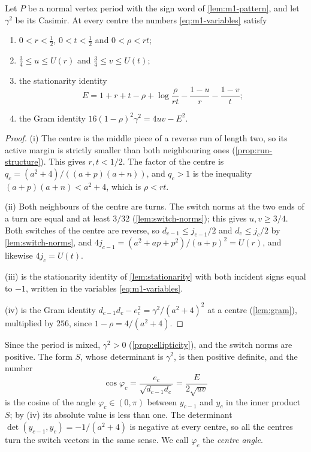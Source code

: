 \begin{lemma}\label{lem:m1-centre-data}
  Let $P$ be a normal vertex period with the sign word of \cref{lem:m1-pattern}, and let $\gamma^2$
  be its Casimir. At every centre the numbers \eqref{eq:m1-variables} satisfy
  \begin{enumerate}[label=\textup{(\roman*)}]
    \item $0<r<\tfrac12$, $0<t<\tfrac12$ and $0<\rho<rt$;
    \item $\tfrac34\le u\le U(r)$ and $\tfrac34\le v\le U(t)$;
    \item the stationarity identity
    \begin{equation}\label{eq:m1-stat}
      E=1+r+t-\rho+\log\frac{\rho}{rt}-\frac{1-u}r-\frac{1-v}t;
    \end{equation}
    \item the Gram identity $16(1-\rho)^2\gamma^2=4uv-E^2$.
  \end{enumerate}
\end{lemma}

\begin{proof}
  (i) The centre is the middle piece of a reverse run of length two, so its active margin is
  strictly smaller than both neighbouring ones (\cref{prop:run-structure}). This gives
  $r,t<1/2$. The factor of the centre is $q_c=(a^2+4)/((a+p)(a+n))$, and $q_c>1$ is the
  inequality $(a+p)(a+n)<a^2+4$, which is $\rho<rt$.

  (ii) Both neighbours of the centre are turns. The switch norms at the two ends of a turn are
  equal and at least $3/32$ (\cref{lem:switch-norms}); this gives $u,v\ge 3/4$. Both switches of
  the centre are reverse, so $d_{c-1}\le j_{c-1}/2$ and $d_c\le j_c/2$ by \cref{lem:switch-norms},
  and $4j_{c-1}=(a^2+ap+p^2)/(a+p)^2=U(r)$, and likewise $4j_c=U(t)$.

  (iii) is the stationarity identity of \cref{lem:stationarity} with both incident signs equal to
  $-1$, written in the variables \eqref{eq:m1-variables}.

  (iv) is the Gram identity $d_{c-1}d_c-e_c^2=\gamma^2/(a^2+4)^2$ at a centre (\cref{lem:gram}),
  multiplied by $256$, since $1-\rho=4/(a^2+4)$.
\end{proof}

Since the period is mixed, $\gamma^2>0$ (\cref{prop:ellipticity}), and the switch norms are
positive. The form $S$, whose determinant is $\gamma^2$, is then positive definite, and the number
\[
  \cos\varphi_c=\frac{e_c}{\sqrt{d_{c-1}d_c}}=\frac{E}{2\sqrt{uv}}
\]
is the cosine of the angle $\varphi_c\in(0,\pi)$ between $y_{c-1}$ and $y_c$ in the inner product
$S$; by (iv) its absolute value is less than one. The determinant $\det(y_{c-1},y_c)=-1/(a^2+4)$
is negative at every centre, so all the centres turn the switch vectors in the same sense. We call
$\varphi_c$ the \emph{centre angle}.

